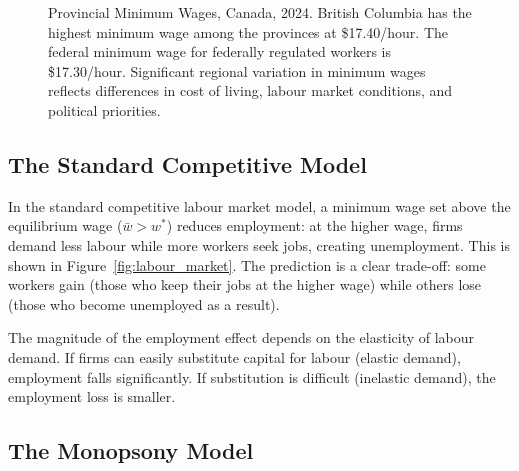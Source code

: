 \begin{figure}[H]
\centering
{}
\caption{Provincial Minimum Wages, Canada, 2024. British Columbia has the highest
  minimum wage among the provinces at \$17.40/hour. The federal minimum wage for
  federally regulated workers is \$17.30/hour. Significant regional variation in minimum
  wages reflects differences in cost of living, labour market conditions, and
  political priorities.}
\label{fig:min_wage}
\end{figure}

\subsection{The Standard Competitive Model}

In the standard competitive labour market model, a minimum wage set above the equilibrium wage ($\bar{w} > w^*$) reduces employment: at the higher wage, firms demand less labour while more workers seek jobs, creating unemployment. This is shown in Figure~\ref{fig:labour_market}. The prediction is a clear trade-off: some workers gain (those who keep their jobs at the higher wage) while others lose (those who become unemployed as a result).

The magnitude of the employment effect depends on the elasticity of labour demand. If firms can easily substitute capital for labour (elastic demand), employment falls significantly. If substitution is difficult (inelastic demand), the employment loss is smaller.

\subsection{The Monopsony Model}

